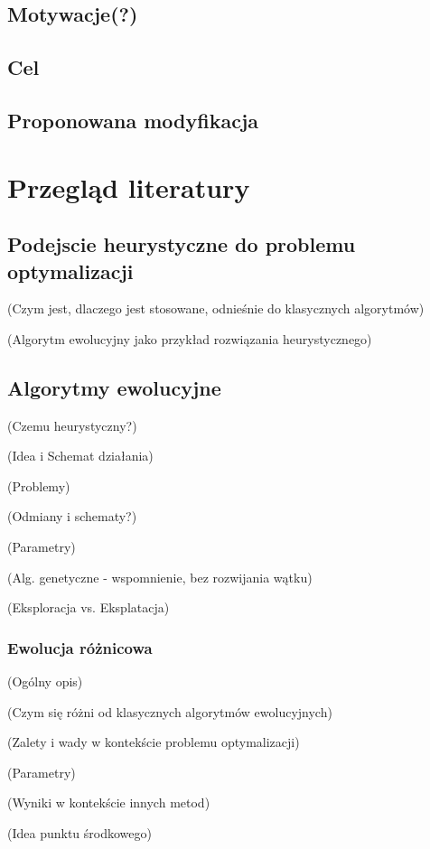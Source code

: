 \documentclass[11pt]{report}
\begin{document}
\section{Motywacje(?)}
\section{Cel}
\section{Proponowana modyfikacja} %

\chapter{Przegląd literatury}
\section{Podejscie heurystyczne do problemu optymalizacji}
\par{
(Czym jest, dlaczego jest stosowane, odnieśnie do klasycznych algorytmów)
}
\par{
(Algorytm ewolucyjny jako przykład rozwiązania heurystycznego)
}
\section{Algorytmy ewolucyjne}
\par{
(Czemu heurystyczny?)
}
\par{
(Idea i Schemat działania)
}
\par{
(Problemy)
}
\par{
(Odmiany i schematy?)
}
\par{
(Parametry)
}
\par{
(Alg. genetyczne - wspomnienie, bez rozwijania wątku)
}
\par{
(Eksploracja vs. Eksplatacja)
}
\subsection{Ewolucja różnicowa}
\par{
(Ogólny opis)
}
\par{
(Czym się różni od klasycznych algorytmów ewolucyjnych)
}
\par{
(Zalety i wady w kontekście problemu optymalizacji)
}
\par{
(Parametry)
}
\par{
(Wyniki w kontekście innych metod)
}
\par{
(Idea punktu środkowego)
}
\end{document}
